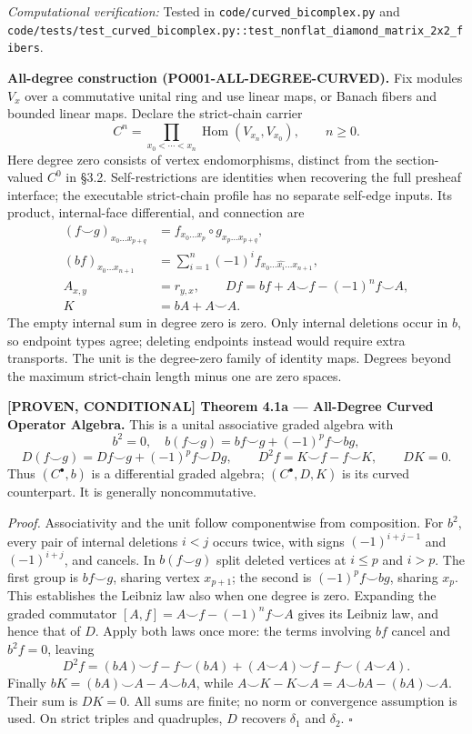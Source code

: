 \documentclass[
  english,
  10pt,
  a4paper,
]{article}
\renewenvironment{quote}
  {\begin{leftbar}\small}
  {\end{leftbar}}
\begin{document}
\emph{Computational verification:} Tested in
\texttt{code/curved\_bicomplex.py} and
\nolinkurl{code/tests/test_curved_bicomplex.py::test_nonflat_diamond_matrix_2x2_fibers}.

\textbf{All-degree construction (PO001-ALL-DEGREE-CURVED).} Fix modules
\(V_x\) over a commutative unital ring and use linear maps, or Banach
fibers and bounded linear maps. Declare the strict-chain carrier \[
C^n=\prod_{x_0<\cdots<x_n}\operatorname{Hom}(V_{x_n},V_{x_0}),\qquad n\ge0.
\] Here degree zero consists of vertex endomorphisms, distinct from the
section-valued \(C^0\) in §3.2. Self-restrictions are identities when
recovering the full presheaf interface; the executable strict-chain
profile has no separate self-edge inputs. Its product, internal-face
differential, and connection are \[
\begin{aligned}
(f\smile g)_{x_0\ldots x_{p+q}}
 &=f_{x_0\ldots x_p}\circ g_{x_p\ldots x_{p+q}},\\
(bf)_{x_0\ldots x_{n+1}}
 &=\sum_{i=1}^{n}(-1)^i f_{x_0\ldots\widehat{x_i}\ldots x_{n+1}},\\
A_{x,y}&=r_{y,x},\qquad
Df=bf+A\smile f-(-1)^n f\smile A,\\
K&=bA+A\smile A.
\end{aligned}
\] The empty internal sum in degree zero is zero. Only internal
deletions occur in \(b\), so endpoint types agree; deleting endpoints
instead would require extra transports. The unit is the degree-zero
family of identity maps. Degrees beyond the maximum strict-chain length
minus one are zero spaces.

\begin{quote}
\textbf{{[}PROVEN, CONDITIONAL{]} Theorem 4.1a --- All-Degree Curved
Operator Algebra.} This is a unital associative graded algebra with \[
b^2=0,\quad b(f\smile g)=bf\smile g+(-1)^p f\smile bg,
\] \[
D(f\smile g)=Df\smile g+(-1)^p f\smile Dg,\qquad
D^2f=K\smile f-f\smile K,\qquad DK=0.
\] Thus \((C^\bullet,b)\) is a differential graded algebra;
\((C^\bullet,D,K)\) is its curved counterpart. It is generally
noncommutative.

\emph{Proof.} Associativity and the unit follow componentwise from
composition. For \(b^2\), every pair of internal deletions \(i<j\)
occurs twice, with signs \((-1)^{i+j-1}\) and \((-1)^{i+j}\), and
cancels. In \(b(f\smile g)\) split deleted vertices at \(i\le p\) and
\(i>p\). The first group is \(bf\smile g\), sharing vertex \(x_{p+1}\);
the second is \((-1)^p f\smile bg\), sharing \(x_p\). This establishes
the Leibniz law also when one degree is zero. Expanding the graded
commutator \([A,f]=A\smile f-(-1)^n f\smile A\) gives its Leibniz law,
and hence that of \(D\). Apply both laws once more: the terms involving
\(bf\) cancel and \(b^2f=0\), leaving \[
D^2f=(bA)\smile f-f\smile(bA)
      +(A\smile A)\smile f-f\smile(A\smile A).
\] Finally \(bK=(bA)\smile A-A\smile bA\), while
\(A\smile K-K\smile A=A\smile bA-(bA)\smile A\). Their sum is \(DK=0\).
All sums are finite; no norm or convergence assumption is used. On
strict triples and quadruples, \(D\) recovers \(\delta_1\) and
\(\delta_2\). \(\square\)
\end{quote}
\end{document}
